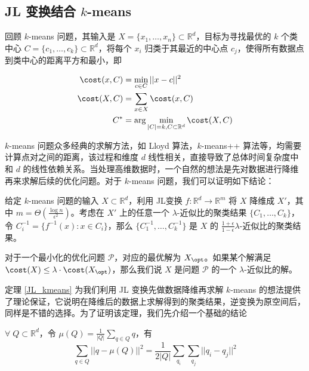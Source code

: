 \documentclass[lang=cn,newtx,10pt,scheme=chinese,chinesefont=nofont,citestyle=gb7714-2015, bibstyle=gb7714-2015]{elegantbook}
\begin{document}
\begin{refsection}


\subsection{JL 变换结合 \texorpdfstring{$k$}{k}-means}

回顾 $k$-means 问题，其输入是 $X=\{x_1,\dots,x_n\}\subset \mathbb{R}^d$，目标为寻找最优的 $k$ 个类中心 $C=\{c_1,\dots,c_k\}\subset \mathbb R^d$，将每个 $x_i$ 归类于其最近的中心点 $c_j$，使得所有数据点到类中心的距离平方和最小，即

\begin{align*}
    \cost(x, C) &= \min_{c\in C} ||x-c||^2 \\
    \cost(X, C) &= \sum_{x\in X}\cost(x, C) \\
    C^* &= \arg\min_{|C|=k,C\subset\mathbb R^d} \cost(X,C)
\end{align*}

$k$-means 问题众多经典的求解方法，如 Lloyd 算法，$k$-means++ 算法等，均需要计算点对之间的距离，该过程和维度 $d$ 线性相关，直接导致了总体时间复杂度中和 $d$ 的线性依赖关系。当处理高维数据时，一个自然的想法是先对数据进行降维再来求解后续的优化问题。对于 $k$-means 问题，我们可以证明如下结论：

\begin{theorem}\label{JL_kmeans}
    给定 $k$-means 问题的输入 $X\subset\mathbb R^d$，利用 JL变换 $f:\mathbb R^d\rightarrow\mathbb R^m$ 将 $X$ 降维成 $X'$，其中 $m=\Theta(\frac{\log n}{\epsilon^2})$。考虑在 $X'$ 上的任意一个 $\lambda$-近似比的聚类结果 $\{C_1,\dots,C_k\}$，令 $C_i^{-1}=\{f^{-1}(x):x\in C_i\}$，那么 $\{C_1^{-1},\dots,C_k^{-1}\}$ 是 $X$ 的 $\frac{1+\epsilon}{1-\epsilon}\lambda$-近似比的聚类结果。 
\end{theorem}

\begin{remark}
    对于一个最小化的优化问题 $\mathcal{P}$，对应的最优解为 $X_{\opt}$。如果某个解满足 $\cost(X)\le\lambda\cdot\cost(X_{\opt})$，那么我们说 $X$ 是问题 $\mathcal{P}$ 的一个 $\lambda$-近似比的解。
\end{remark}

定理 \ref{JL_kmeans} 为我们利用 JL 变换先做数据降维再求解 $k$-means 的想法提供了理论保证，它说明在降维后的数据上求解得到的聚类结果，逆变换为原空间后，同样是不错的选择。为了证明该定理，我们先介绍一个基础的结论

\begin{proposition}\label{JL_kmeans_proposition1}
    $\forall\;Q\subset\mathbb R^d$，令 $\mu(Q)=\frac{1}{|Q|}\sum_{q\in Q}q$，有
    \begin{equation*}
        \sum_{q\in Q}||q-\mu(Q)||^2 = \frac{1}{2|Q|}\sum_{q_i}\sum_{q_j}||q_i-q_j||^2
    \end{equation*}
\end{proposition}


\end{refsection}
\end{document}
